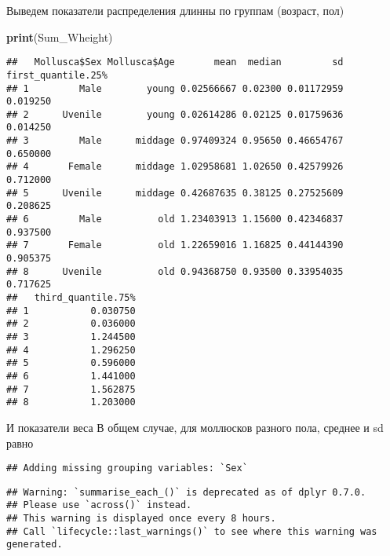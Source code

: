 \documentclass[
]{article}
\newenvironment{Shaded}{\begin{snugshade}}{\end{snugshade}}
\newcommand{\CommentTok}[1]{\textcolor[rgb]{0.56,0.35,0.01}{\textit{#1}}}
\newcommand{\KeywordTok}[1]{\textcolor[rgb]{0.13,0.29,0.53}{\textbf{#1}}}
\newcommand{\NormalTok}[1]{#1}
\newcommand{\OperatorTok}[1]{\textcolor[rgb]{0.81,0.36,0.00}{\textbf{#1}}}
\newcommand{\StringTok}[1]{\textcolor[rgb]{0.31,0.60,0.02}{#1}}
\begin{document}
Выведем показатели распределения длинны по группам (возраст, пол)

\begin{Shaded}
\begin{Highlighting}[]
\KeywordTok{print}\NormalTok{(Sum_Wheight)}
\end{Highlighting}
\end{Shaded}

\begin{verbatim}
##   Mollusca$Sex Mollusca$Age       mean  median         sd first_quantile.25%
## 1         Male        young 0.02566667 0.02300 0.01172959           0.019250
## 2      Uvenile        young 0.02614286 0.02125 0.01759636           0.014250
## 3         Male      middage 0.97409324 0.95650 0.46654767           0.650000
## 4       Female      middage 1.02958681 1.02650 0.42579926           0.712000
## 5      Uvenile      middage 0.42687635 0.38125 0.27525609           0.208625
## 6         Male          old 1.23403913 1.15600 0.42346837           0.937500
## 7       Female          old 1.22659016 1.16825 0.44144390           0.905375
## 8      Uvenile          old 0.94368750 0.93500 0.33954035           0.717625
##   third_quantile.75%
## 1           0.030750
## 2           0.036000
## 3           1.244500
## 4           1.296250
## 5           0.596000
## 6           1.441000
## 7           1.562875
## 8           1.203000
\end{verbatim}

И показатели веса В общем случае, для моллюсков разного пола, среднее и
sd равно

\begin{Shaded}
\end{Shaded}

\begin{verbatim}
## Adding missing grouping variables: `Sex`
\end{verbatim}

\begin{verbatim}
## Warning: `summarise_each_()` is deprecated as of dplyr 0.7.0.
## Please use `across()` instead.
## This warning is displayed once every 8 hours.
## Call `lifecycle::last_warnings()` to see where this warning was generated.
\end{verbatim}
\end{document}
